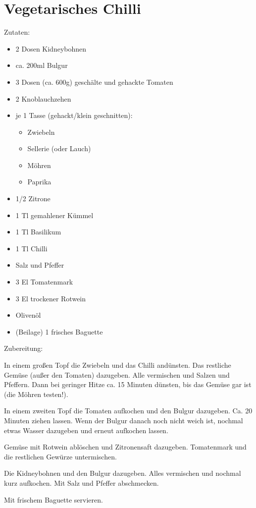 \section{Vegetarisches Chilli}
Zutaten:
\begin{itemize}
    \item 2 Dosen Kidneybohnen
    \item ca. 200ml Bulgur
    \item 3 Dosen (ca. 600g) geschälte und gehackte Tomaten
    \item 2 Knoblauchzehen
    \item je 1 Tasse (gehackt/klein geschnitten):
        \begin{itemize}
            \item Zwiebeln
            \item Sellerie (oder Lauch)
            \item Möhren
            \item Paprika
        \end{itemize}
    \item 1/2 Zitrone
    \item 1 Tl gemahlener Kümmel
    \item 1 Tl Basilikum
    \item 1 Tl Chilli
    \item Salz und Pfeffer
    \item 3 El Tomatenmark
    \item 3 El trockener Rotwein
    \item Olivenöl
    \item (Beilage) 1 frisches Baguette
\end{itemize}

\noindent Zubereitung:

\noindent In einem großen Topf die Zwiebeln und das Chilli andünsten. Das restliche Gemüse (außer den Tomaten) dazugeben. Alle vermischen und Salzen und Pfeffern. Dann bei geringer Hitze ca. 15 Minuten dünsten, bis das Gemüse gar ist (die Möhren testen!).

In einem zweiten Topf die Tomaten aufkochen und den Bulgur dazugeben. Ca. 20 Minuten ziehen lassen. Wenn der Bulgur danach noch nicht weich  ist, nochmal etwas Wasser dazugeben und erneut aufkochen lassen.

Gemüse mit Rotwein ablöschen und Zitronensaft dazugeben. Tomatenmark und die restlichen Gewürze untermischen.

Die Kidneybohnen und den Bulgur dazugeben. Alles vermischen und nochmal kurz aufkochen. Mit Salz und Pfeffer abschmecken.

Mit frischem Baguette servieren.

\mbox{}
\vfill
\begin{center}
\end{center}
\vfill
\mbox{ }
\newpage
